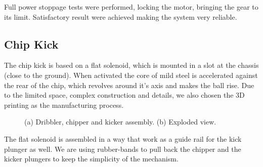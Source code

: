 Full power stoppage tests were performed, locking the motor, bringing the gear to its limit. Satisfactory result were achieved making the system very reliable.

\subsection{Chip Kick}

The chip kick is based on a flat solenoid, which is mounted in a slot at the chassis (close to the ground). When activated the core of mild steel is accelerated against the rear of the chip, which revolves around it's axis and makes the ball rise. Due to the limited space, complex construction and details, we also chosen the 3D printing as the manufacturing process.

\begin{figure}[thpb]
	\centering
	\caption{(a) Dribbler, chipper and kicker assembly. (b) Exploded view.}
	\label{mec}
\end{figure}

The flat solenoid is assembled in a way that work as a guide rail for the kick plunger as well. We are using rubber-bands to pull back the chipper and the kicker plungers to keep the simplicity of the mechanism.
